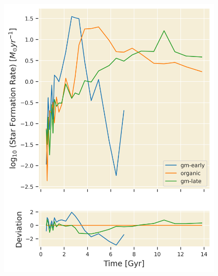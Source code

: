 \documentclass[twocolumn]{article}
\begin{document}
	\begin{figure}
			\centering 
			\includegraphics[width=\columnwidth]{./SFR.png}
	\end{figure}
\end{document}
